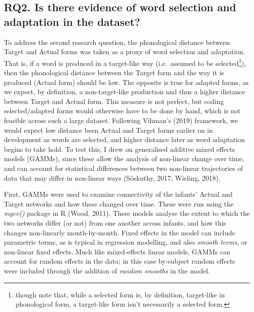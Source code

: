 \documentclass[
  man]{apa6}
\begin{document}
\hypertarget{rq2.-is-there-evidence-of-word-selection-and-adaptation-in-the-dataset}{%
\subsection{RQ2. Is there evidence of word selection and adaptation in the dataset?}\label{rq2.-is-there-evidence-of-word-selection-and-adaptation-in-the-dataset}}

To address the second research question, the phonological distance between Target and Actual forms was taken as a proxy of word selection and adaptation. That is, if a word is produced in a target-like way (i.e.~assumed to be selected\footnote{though note that, while a selected form is, by definition, target-like in phonological form, a target-like form isn't necessarily a selected form.}), then the phonological distance between the Target form and the way it is produced (Actual form) should be low. The opposite is true for adapted forms, as we expect, by definition, a non-target-like production and thus a higher distance between Target and Actual form. This measure is not perfect, but coding selected/adapted forms would otherwise have to be done by hand, which is not feasible across such a large dataset. Following Vihman's (2019) framework, we would expect low distance been Actual and Target forms earlier on in development as words are selected, and higher distance later as word adaptation begins to take hold. To test this, I drew on generalised additive mixed effects models (GAMMs), since these allow the analysis of non-linear change over time, and can account for statistical differences between two non-linear trajectories of data that may differ in non-linear ways (Sóskuthy, 2017; Wieling, 2018).

First, GAMMs were used to examine connectivity of the infants' Actual and Target networks and how these changed over time. These were run using the \emph{mgcv()} package in R (Wood, 2011). These models analyse the extent to which the two networks differ (or not) from one another across infants, and how this changes non-linearly month-by-month. Fixed effects in the model can include parametric terms, as is typical in regression modelling, and also \emph{smooth terms}, or non-linear fixed effects. Much like mixed-effects linear models, GAMMs can account for random effects in the data; in this case by-subject random effects were included through the addition of \emph{random smooths} in the model.
\end{document}
